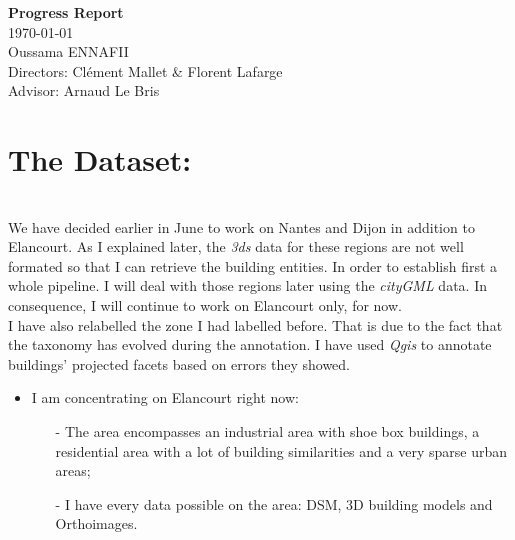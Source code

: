 \documentclass[a4paper, 11pt]{article}
\begin{document}
	\begin{centering}
		\Large{\textbf{Progress Report}}\\
		\large{\today}
~\\
		Oussama ENNAFII\\
		Directors: Cl\'ement Mallet \& Florent Lafarge \\
		Advisor: Arnaud Le Bris \\

	\end{centering}





	\section{The Dataset:}
~\\

	We have decided earlier in June to work on Nantes and Dijon in addition to
	Elancourt. As I explained later, the \textit{3ds} data for these regions are
	not well formated so that I can retrieve the building entities. In order to
	establish first a whole pipeline. I will deal with those regions later using
	the \textit{cityGML} data. In consequence, I will continue to work on
	Elancourt only, for now.\\

	I have also relabelled the zone I had labelled before. That is due to the fact
	that the taxonomy has evolved during the annotation. I have used \textit{Qgis}
	to annotate buildings' projected facets based on errors they showed.


	\begin{itemize}
		\item I am concentrating on Elancourt right now:
		\begin{itemize}
			\item[-] The area encompasses an industrial area with shoe box buildings, a residential area with a lot of building similarities and a very sparse urban areas;
			\item[-] I have every data possible on the area: DSM, 3D building models and Orthoimages.
		\end{itemize}
	\end{itemize}
\end{document}
